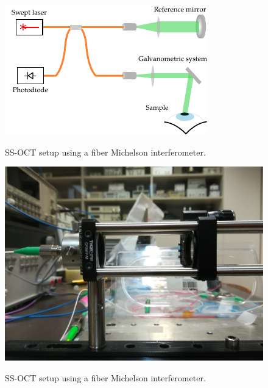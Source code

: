 \begin{figure}[bth]
	\myfloatalign
	{\includegraphics[width=0.8\linewidth]{gfx/setup-diagrams/basic-oct.pdf}}
	\caption{SS-OCT setup using a fiber Michelson interferometer.}\label{fig:basic-oct}
\end{figure}


\begin{figure}[bth]
	\myfloatalign
	{\includegraphics[width=0.6\linewidth]{gfx/ch3/reference-arm-photo}}
	\caption{SS-OCT setup using a fiber Michelson interferometer.}\label{fig:reference-arm-photo}
\end{figure}

